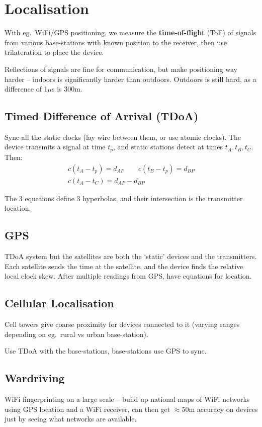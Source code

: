\documentclass[a4paper, 11pt]{article}
\begin{document}
\section*{Localisation}
{
    With eg.\ WiFi/GPS positioning, we measure the \textbf{time-of-flight} (ToF) of signals from various base-stations with known position to the receiver, then use trilateration to place the device.

    Reflections of signals are fine for communication, but make positioning way harder -- indoors is significantly harder than outdoors. Outdoors is still hard, as a difference of 1\(\mu\)s is 300m.

    \subsection*{Timed Difference of Arrival (TDoA)}
    {
        Sync all the static clocks (lay wire between them, or use atomic clocks). The device transmits a signal at time \(t_p\), and static stations detect at times \(t_A,t_B,t_C\). Then:
        \begin{gather*}
        c(t_A - t_p) = d_{AP}
        \qquad
        c(t_B - t_p) = d_{BP}
        \\
        c(t_A - t_C) = d_{AP} - d_{BP}
        \end{gather*}

        The 3 equations define 3 hyperbolas, and their intersection is the transmitter location.
    }
    \subsection*{GPS}
    {
        TDoA system but the satellites are both the `static' devices and the transmitters. Each satellite sends the time at the satellite, and the device finds the relative local clock skew. After multiple readings from GPS, have equations for location.
    }
    \subsection*{Cellular Localisation}
    {
        Cell towers give coarse proximity for devices connected to it (varying ranges depending on eg.\ rural vs urban base-station).

        Use TDoA with the base-stations, base-stations use GPS to sync.
    }
    \subsection*{Wardriving}
    {
        WiFi fingerprinting on a large scale -- build up national maps of WiFi networks using GPS location and a WiFi receiver, can then get \(\approx\)50m accuracy on devices just by seeing what networks are available.
    }
}
\end{document}
